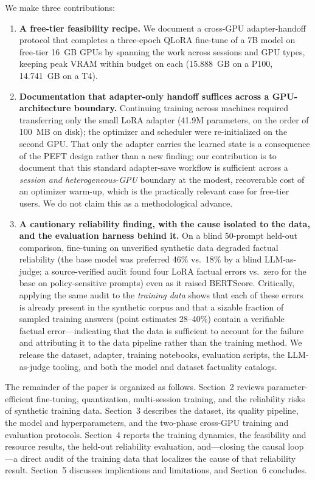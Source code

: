 \documentclass[11pt, a4paper]{article}
\begin{document}
We make three contributions:

\begin{enumerate}
    \item \textbf{A free-tier feasibility recipe.} We document a cross-GPU adapter-handoff protocol that completes a three-epoch QLoRA fine-tune of a 7B model on free-tier 16~GB GPUs by spanning the work across sessions and GPU types, keeping peak VRAM within budget on each (15.888~GB on a P100, 14.741~GB on a T4).
    \item \textbf{Documentation that adapter-only handoff suffices across a GPU-architecture boundary.} Continuing training across machines required transferring only the small LoRA adapter (41.9M parameters, on the order of 100~MB on disk); the optimizer and scheduler were re-initialized on the second GPU. That only the adapter carries the learned state is a consequence of the PEFT design rather than a new finding; our contribution is to document that this standard adapter-save workflow is sufficient across a \emph{session and heterogeneous-GPU} boundary at the modest, recoverable cost of an optimizer warm-up, which is the practically relevant case for free-tier users. We do not claim this as a methodological advance.
    \item \textbf{A cautionary reliability finding, with the cause isolated to the data, and the evaluation harness behind it.} On a blind 50-prompt held-out comparison, fine-tuning on unverified synthetic data degraded factual reliability (the base model was preferred 46\% vs.\ 18\% by a blind LLM-as-judge; a source-verified audit found four LoRA factual errors vs.\ zero for the base on policy-sensitive prompts) even as it raised BERTScore. Critically, applying the same audit to the \emph{training data} shows that each of these errors is already present in the synthetic corpus and that a sizable fraction of sampled training answers (point estimates 28--40\%) contain a verifiable factual error---indicating that the data is sufficient to account for the failure and attributing it to the data pipeline rather than the training method. We release the dataset, adapter, training notebooks, evaluation scripts, the LLM-as-judge tooling, and both the model and dataset factuality catalogs.
\end{enumerate}

The remainder of the paper is organized as follows. Section~2 reviews parameter-efficient fine-tuning, quantization, multi-session training, and the reliability risks of synthetic training data. Section~3 describes the dataset, its quality pipeline, the model and hyperparameters, and the two-phase cross-GPU training and evaluation protocols. Section~4 reports the training dynamics, the feasibility and resource results, the held-out reliability evaluation, and---closing the causal loop---a direct audit of the training data that localizes the cause of that reliability result. Section~5 discusses implications and limitations, and Section~6 concludes.
\end{document}

